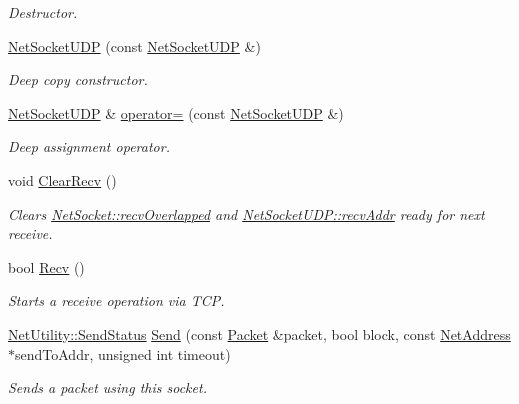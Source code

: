 \begin{DoxyCompactItemize}
\begin{DoxyCompactList}\small\item\em Destructor. \item\end{DoxyCompactList}\item 
\hyperlink{class_net_socket_u_d_p_ac755e915b27452ce2e820e2401f4fa70}{NetSocketUDP} (const \hyperlink{class_net_socket_u_d_p}{NetSocketUDP} \&)
\begin{DoxyCompactList}\small\item\em Deep copy constructor. \item\end{DoxyCompactList}\item 
\hyperlink{class_net_socket_u_d_p}{NetSocketUDP} \& \hyperlink{class_net_socket_u_d_p_a9ddb31922eea639eb1ef495b777b45d2}{operator=} (const \hyperlink{class_net_socket_u_d_p}{NetSocketUDP} \&)
\begin{DoxyCompactList}\small\item\em Deep assignment operator. \item\end{DoxyCompactList}\item 
void \hyperlink{class_net_socket_u_d_p_ad6c506ea179efce7d353b9f0735e2706}{ClearRecv} ()
\begin{DoxyCompactList}\small\item\em Clears \hyperlink{class_net_socket_ac260f690a6f192c22463d1f5ea903d96}{NetSocket::recvOverlapped} and \hyperlink{class_net_socket_u_d_p_ab0fe52f5f72fdceb442d4a06e3944c45}{NetSocketUDP::recvAddr} ready for next receive. \item\end{DoxyCompactList}\item 
bool \hyperlink{class_net_socket_u_d_p_a5b7438968a34510997e9db862e00139b}{Recv} ()
\begin{DoxyCompactList}\small\item\em Starts a receive operation via TCP. \item\end{DoxyCompactList}\item 
\hyperlink{class_net_utility_a8051eca61204ffd818281419bbf44736}{NetUtility::SendStatus} \hyperlink{class_net_socket_u_d_p_ab9f7c46f5aab7fb043a40f831132f213}{Send} (const \hyperlink{class_packet}{Packet} \&packet, bool block, const \hyperlink{class_net_address}{NetAddress} $\ast$sendToAddr, unsigned int timeout)
\begin{DoxyCompactList}\small\item\em Sends a packet using this socket. \item\end{DoxyCompactList}\item 

\end{DoxyCompactItemize}
